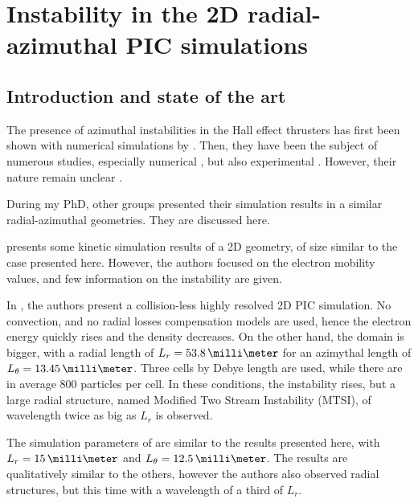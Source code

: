 
\section{Instability in the \ac{2D} radial-azimuthal \ac{PIC} simulations}
  \label{sec-PIC-ECDI}
  
  \subsection{Introduction and state of the art} \label{subsec-indroECDI}
    
    
    The presence of azimuthal instabilities in the Hall effect thrusters has first been shown with numerical simulations by \citet{adam2004}.
    Then, they have been the subject of numerous studies, especially numerical \citep{ducrocq2006,lafleur2016,lafleur2016a,croes2017,croes2018,janhunen2018,taccogna2019}, but also experimental \citep{honore2011,cavalier2013,cavalier2013a}.
    However, their nature remain unclear \citep{boeuf2018}.

    \vspace{1ex}
    During my PhD, other groups presented their simulation results in a similar radial-azimuthal geometries. They are discussed here.
    
    \citet{hara2019a} presents some kinetic simulation results of a \ac{2D} geometry, of size similar to the case presented here.
    However, the authors focused on the electron mobility values, and few information on the instability are given.
    
    In \citet{janhunen2018}, the authors present a collision-less highly resolved \ac{2D} \ac{PIC} simulation.
    No convection, and no radial losses compensation models are used, hence the electron energy quickly rises and the density decreases.
    On the other hand, the domain is bigger, with a radial length of $L_r = 53.8\,\milli\meter$ for an azimythal length of $L_{\theta} = 13.45 \,\milli\meter$.
    Three cells by Debye length are used, while there are in average 800 particles per cell.
    In these conditions, the instability rises, but a large radial structure, named Modified Two Stream Instability (MTSI), of wavelength twice as big as $L_r$  is observed.
    
    The simulation parameters of \citet{taccogna2019} are similar to the results presented here, with  $L_r = 15\,\milli\meter$ and $L_{\theta} = 12.5 \,\milli\meter$.
    The results are qualitatively similar to the others, however the authors also observed radial structures, but this time with a wavelength of a third of $L_r$.
        
